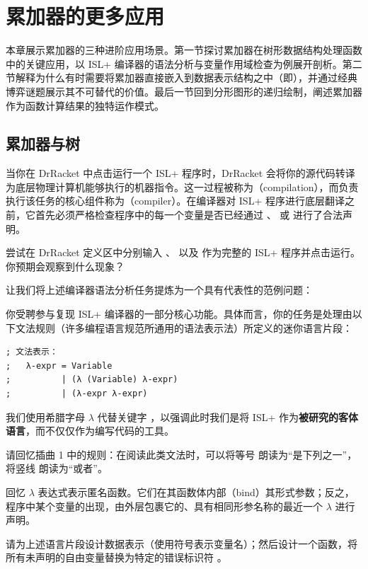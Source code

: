 
\chapter{累加器的更多应用}
\label{sec:ch33_more_uses}

本章展示累加器的三种进阶应用场景。第一节探讨累加器在树形数据结构处理函数中的关键应用，以 ISL+ 编译器的语法分析与变量作用域检查为例展开剖析。第二节解释为什么有时需要将累加器直接嵌入到数据表示结构之中（即），并通过经典博弈谜题展示其不可替代的价值。最后一节回到分形图形的递归绘制，阐述累加器作为函数计算结果的独特运作模式。

\section{累加器与树}
\label{sec:ch33_1}

当你在 DrRacket 中点击运行一个 ISL+ 程序时，DrRacket 会将你的源代码转译为底层物理计算机能够执行的机器指令。这一过程被称为（compilation），而负责执行该任务的核心组件称为（compiler）。在编译器对 ISL+ 程序进行底层翻译之前，它首先必须严格检查程序中的每一个变量是否已经通过 、 或  进行了合法声明。

\begin{notebox}
尝试在 DrRacket 定义区中分别输入 、 以及  作为完整的 ISL+ 程序并点击运行。你预期会观察到什么现象？
\end{notebox}

让我们将上述编译器语法分析任务提炼为一个具有代表性的范例问题：

\begin{notebox}
你受聘参与复现 ISL+ 编译器的一部分核心功能。具体而言，你的任务是处理由以下文法规则（许多编程语言规范所通用的语法表示法）所定义的迷你语言片段：
\begin{lstlisting}[language=BSL]
; 文法表示：
;   λ-expr = Variable
;          | (λ (Variable) λ-expr)
;          | (λ-expr λ-expr)
\end{lstlisting}
\begin{notebox}[记号说明]
我们使用希腊字母 $\lambda$ 代替关键字 ，以强调此时我们是将 ISL+ 作为\textbf{被研究的客体语言}，而不仅仅作为编写代码的工具。
\end{notebox}
请回忆插曲 1 中的规则：在阅读此类文法时，可以将等号 \code{=} 朗读为“是下列之一”，将竖线 \code{|} 朗读为“或者”。

回忆 $\lambda$ 表达式表示匿名函数。它们在其函数体内部（bind）其形式参数；反之，程序中某个变量的出现，由外层包裹它的、具有相同形参名称的最近一个 $\lambda$ 进行声明。

请为上述语言片段设计数据表示（使用符号表示变量名）；然后设计一个函数，将所有未声明的自由变量替换为特定的错误标识符 。
\end{notebox}


